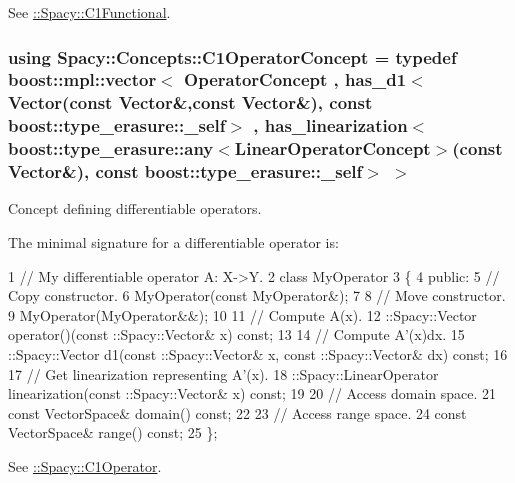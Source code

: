 See \hyperlink{group__SpacyGroup_gaa7cb8ef6c287b0af0352d3dd0eb9f200_C1FunctionalAnchor}{\+:\+:Spacy\+:\+:C1\+Functional}. \hypertarget{group__ConceptGroup_ga14a12c741dc237e32862fa4bc315451b_ga14a12c741dc237e32862fa4bc315451b}{}
\subsubsection[{C1\+Operator\+Concept}]{\setlength{\rightskip}{0pt plus 5cm}using {\bf Spacy\+::\+Concepts\+::\+C1\+Operator\+Concept} = typedef boost\+::mpl\+::vector$<$ Operator\+Concept , has\+\_\+d1$<$Vector(const Vector\&,const Vector\&), const boost\+::type\+\_\+erasure\+::\+\_\+self$>$ , has\+\_\+linearization$<$boost\+::type\+\_\+erasure\+::any$<$Linear\+Operator\+Concept$>$(const Vector\&), const boost\+::type\+\_\+erasure\+::\+\_\+self$>$ $>$}\label{group__ConceptGroup_ga14a12c741dc237e32862fa4bc315451b_ga14a12c741dc237e32862fa4bc315451b}


Concept defining differentiable operators. 

\label{group__ConceptGroup_ga14a12c741dc237e32862fa4bc315451b_C1OperatorConceptAnchor}%
\hypertarget{group__ConceptGroup_ga14a12c741dc237e32862fa4bc315451b_C1OperatorConceptAnchor}{}%
The minimal signature for a differentiable operator is\+: 
\begin{DoxyCode}
1 // My differentiable operator A: X->Y.
2 class MyOperator
3 \{
4 public:
5   // Copy constructor.
6   MyOperator(const MyOperator&);
7 
8   // Move constructor.
9   MyOperator(MyOperator&&);
10 
11   // Compute A(x).
12   ::Spacy::Vector operator()(const ::Spacy::Vector& x) const;
13 
14   // Compute A'(x)dx.
15   ::Spacy::Vector d1(const ::Spacy::Vector& x, const ::Spacy::Vector& dx) const;
16 
17   // Get linearization representing A'(x).
18  ::Spacy::LinearOperator linearization(const ::Spacy::Vector& x) const;
19 
20   // Access domain space.
21   const VectorSpace& domain() const;
22 
23   // Access range space.
24   const VectorSpace& range() const;
25 \};
\end{DoxyCode}


See \hyperlink{group__SpacyGroup_ga87ae8cb0d7a567a4bb181e0a9f182620_C1OperatorAnchor}{\+:\+:Spacy\+:\+:C1\+Operator}. \hypertarget{group__ConceptGroup_gafb4414561b07b27100cad81ecf152e47_gafb4414561b07b27100cad81ecf152e47}{}
